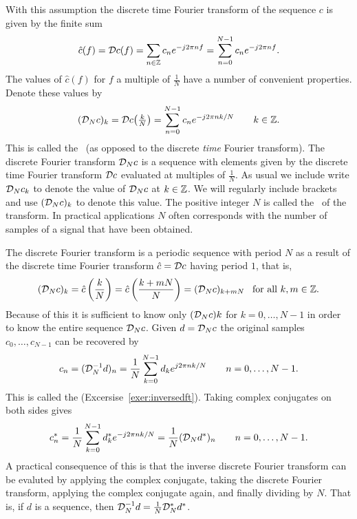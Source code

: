 With this assumption the discrete time Fourier transform of the sequence $c$ is given by the finite sum
\[
\hat{c}(f) = {\mathcal D} c(f) = \sum_{n \in {\mathbb Z}} c_n e^{-j 2\pi n f}  = \sum_{n = 0}^{N-1} c_n e^{-j 2\pi n f}.
\]
The values of $\hat{c}(f)$ for $f$ a multiple of $\tfrac{1}{N}$ have a number of convenient properties.  Denote these values by
\begin{equation}\label{eq:dftdefn}
({\mathcal D}_N c)_k = {\mathcal D} c\big(\tfrac{k}{N}\big) = \sum_{n = 0}^{N-1} c_n e^{-j 2\pi n k/N} \qquad k \in {\mathbb Z}. 
\end{equation}
This is called the~ (as opposed to the discrete \emph{time} Fourier transform).  The discrete Fourier transform ${\mathcal D}_N c$ is a sequence with elements given by the discrete time Fourier transform ${\mathcal D} c$ evaluated at multiples of $\tfrac{1}{N}$.  As usual we include write ${\mathcal D}_N c_k$ to denote the value of ${\mathcal D}_N c$ at $k \in {\mathbb Z}$.  We will regularly include brackets and use $({\mathcal D}_N c)_k$ to denote this value.  The positive integer $N$ is called the~ of the transform.  In practical applications $N$ often corresponds with the number of samples of a signal that have been obtained.


The discrete Fourier transform is a periodic sequence with period $N$ as a result of the discrete time Fourier transform $\hat{c} = {\mathcal D} c$ having period $1$, that is,
\[
({\mathcal D}_N c)_k = \hat{c}\left( \frac{k}{N} \right) = \hat{c}\left( \frac{k + mN}{N} \right) = ({\mathcal D}_N c)_{k+mN} \;\;\; \text{for all $k,m\in{\mathbb Z}$}.
\]
Because of this it is sufficient to know only $({\mathcal D}_N c)k$ for $k = 0,\dots,N-1$ in order to know the entire sequence ${\mathcal D}_N c$.  Given $d = {\mathcal D}_N c$ the original samples $c_0, \dots, c_{N-1}$ can be recovered by 
\[
c_n = ({\mathcal D}_N^{-1}d)_n = \frac{1}{N}\sum_{k = 0}^{N-1} d_k e^{j 2\pi n k / N} \qquad n = 0, \dots, N-1.
\]
This is called the  (Excersise~\ref{exer:inversedft}). Taking complex conjugates on both sides gives
\[
c_n^* = \frac{1}{N} \sum_{k = 0}^{N-1} d_k^* e^{-j 2\pi n k / N} = \frac{1}{N} ({\mathcal D}_N d^*)_n  \qquad n = 0, \dots, N-1.
\]
A practical consequence of this is that the inverse discrete Fourier transform can be evaluted by applying the complex conjugate, taking the discrete Fourier transform, applying the complex conjugate again, and finally dividing by $N$.  That is, if $d$ is a sequence, then ${\mathcal D}_N^{-1} d = \tfrac{1}{N}{\mathcal D}_N^* d^*$.

